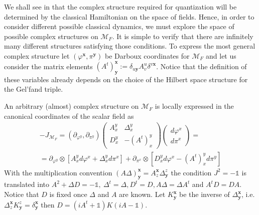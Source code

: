 \documentclass{elsarticle}%
\begin{document}
We shall see  in \cite{alonsoGeometricFlavours2024} that the complex structure required for quantization will be determined by the classical Hamiltonian on the space of fields. Hence, in order to consider different possible classical dynamics, we must explore the space of possible complex structures on $\mathcal{M}_F$.  It is simple to verify that there are infinitely many different structures satisfying those conditions. To express the most general complex structure let $(\varphi^{\mathbf{x}},\pi^{\mathbf{y}})$ be Darboux coordinates for $\mathcal{M}_F$ and let us consider the matrix elements $(A^t)^{\mathbf{x}}_\mathbf{y}:= \delta_{u \mathbf{y}} A^u_v\delta^{v\mathbf{x}}$. Notice that the definition of these variables already depends on the choice of the Hilbert space structure for the Gel'fand triple.

An arbitrary (almost) complex structure on $\mathcal{M}_F$ is locally expressed in the canonical coordinates of the scalar field as 
\begin{multline}
\label{eq:complexStructure}
-J_{\mathcal{M}_F} =
(\partial_{\varphi^y},\partial_{\pi^y})\left( \begin{array}{cc}
A^y_x & \Delta^y_x \\
D^y_x & -(A^t)^y_x
\end{array} \right)  \left( \begin{array}{c}
d\varphi^{x} \\
d\pi^{x}
\end{array} \right)=\\
=  \partial_{\varphi^y} \otimes[A^y_xd\varphi^x+\Delta^y_xd\pi^x]+ \partial_{\pi^x}\otimes [D^y_xd\varphi^x-(A^t)^y_xd\pi^y]
\end{multline}
With  the multiplication convention $(A\Delta)^{\mathbf{x}}_{\mathbf{y}}=A^{\mathbf{x}}_z\Delta^z_{\mathbf{y}}$ the condition $J^2=-\mathds{1}$ is translated into  $A^2+\Delta D=-\mathds{1},\ \Delta^t=\Delta, D^t=D, A\Delta=\Delta A^t$ and $A^tD=DA$. Notice that $D$ is fixed once $\Delta$  and $A$ are known. Let $K^{\mathbf{x}}_{\mathbf{y}}$ be the inverse of $\Delta_\mathbf{y}^{\mathbf{x}}$, i.e. $\Delta^{\mathbf{x}}_zK^z_\mathbf{y}=\delta_\mathbf{y}^{\mathbf{x}}$ then $D=(iA^t+\mathds{1})K(iA-\mathds{1})$.

 
\end{document}
